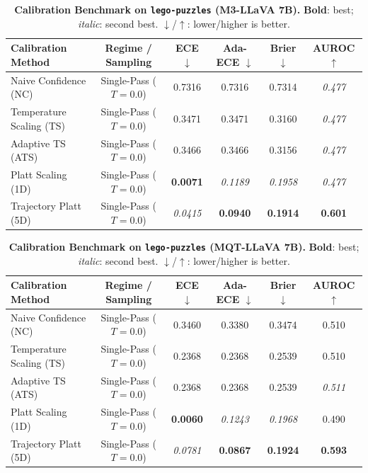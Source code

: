 \begin{table}[t]
\setlength{\tabcolsep}{4pt}
\renewcommand{\arraystretch}{1.05}
\centering
\footnotesize
\begin{tabular}{lccccc}
\toprule
\textbf{Calibration Method} & \textbf{Regime / Sampling} & \textbf{ECE} $\downarrow$ & \textbf{Ada-ECE} $\downarrow$ & \textbf{Brier} $\downarrow$ & \textbf{AUROC} $\uparrow$ \\
\midrule
Naive Confidence (NC) & Single-Pass ($T = 0.0$) & 0.7316 & 0.7316 & 0.7314 & \textit{0.477} \\
Temperature Scaling (TS) & Single-Pass ($T = 0.0$) & 0.3471 & 0.3471 & 0.3160 & \textit{0.477} \\
Adaptive TS (ATS) & Single-Pass ($T = 0.0$) & 0.3466 & 0.3466 & 0.3156 & \textit{0.477} \\
Platt Scaling (1D) & Single-Pass ($T = 0.0$) & \textbf{0.0071} & \textit{0.1189} & \textit{0.1958} & \textit{0.477} \\
Trajectory Platt (5D) & Single-Pass ($T = 0.0$) & \textit{0.0415} & \textbf{0.0940} & \textbf{0.1914} & \textbf{0.601} \\
\bottomrule
\end{tabular}
\caption{\textbf{Calibration Benchmark on \texttt{lego-puzzles} (M3-LLaVA 7B).} \textbf{Bold}: best; \textit{italic}: second best. $\downarrow$/$\uparrow$: lower/higher is better.}
\label{tab:benchmark_m3_legopuzzles}
\end{table}

\begin{table}[t]
\setlength{\tabcolsep}{4pt}
\renewcommand{\arraystretch}{1.05}
\centering
\footnotesize
\begin{tabular}{lccccc}
\toprule
\textbf{Calibration Method} & \textbf{Regime / Sampling} & \textbf{ECE} $\downarrow$ & \textbf{Ada-ECE} $\downarrow$ & \textbf{Brier} $\downarrow$ & \textbf{AUROC} $\uparrow$ \\
\midrule
Naive Confidence (NC) & Single-Pass ($T = 0.0$) & 0.3460 & 0.3380 & 0.3474 & 0.510 \\
Temperature Scaling (TS) & Single-Pass ($T = 0.0$) & 0.2368 & 0.2368 & 0.2539 & 0.510 \\
Adaptive TS (ATS) & Single-Pass ($T = 0.0$) & 0.2368 & 0.2368 & 0.2539 & \textit{0.511} \\
Platt Scaling (1D) & Single-Pass ($T = 0.0$) & \textbf{0.0060} & \textit{0.1243} & \textit{0.1968} & 0.490 \\
Trajectory Platt (5D) & Single-Pass ($T = 0.0$) & \textit{0.0781} & \textbf{0.0867} & \textbf{0.1924} & \textbf{0.593} \\
\bottomrule
\end{tabular}
\caption{\textbf{Calibration Benchmark on \texttt{lego-puzzles} (MQT-LLaVA 7B).} \textbf{Bold}: best; \textit{italic}: second best. $\downarrow$/$\uparrow$: lower/higher is better.}
\label{tab:benchmark_mqt_legopuzzles}
\end{table}
